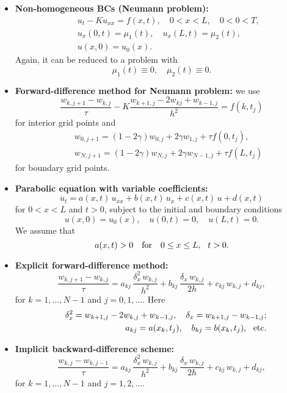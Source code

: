 \documentclass[12pt]{article}
\begin{document}
\begin{itemize}
\item \textbf{\textbf{Non-homogeneous BCs (Neumann problem):}}
\begin{eqnarray}
&&u_{t} - K u_{xx} = f(x,t), \quad
0<x< L, \quad 0<0<T,   \nonumber \\
&&u_{x}(0,t)=\mu_{1}(t), \quad u_{x}(L,t)=\mu_{2}(t), \nonumber \\
&&u(x, 0) = u_{0}(x).   \nonumber
\end{eqnarray}
Again, it can be reduced to a problem with
\[
\mu_{1}(t)\equiv 0, \quad \mu_{2}(t)\equiv 0.
\]


\item \textbf{Forward-difference method for Neumann problem:} we use
\[
\frac{w_{k,j+1}-w_{k,j}}{\tau}-K
\frac{w_{k+1, j}-2w_{kj}+w_{k-1,j}}{h^{2}}=f(k,t_j)
\]
for interior grid points and
\begin{eqnarray}
&&w_{0,j+1}=(1-2\gamma)w_{0,j}+2\gamma w_{1,j}+\tau f(0,t_j),  \nonumber \\
&&w_{N,j+1}=(1-2\gamma)w_{N,j}+2\gamma w_{N-1,j}+\tau f(L,t_j)  \nonumber
\end{eqnarray}
for boundary grid points.


\item \textbf{Parabolic equation with variable coefficients:}
\[
u_{t} =a(x,t) \, u_{xx} +
b(x,t) \, u_{x} + c(x,t) \, u + d(x,t)
\]
for $0<x< L$ and $t>0$, subject to the initial and boundary conditions
\[
u(x, 0) = u_{0}(x), \quad
u(0,t)=0, \quad u(L,t)=0.
\]
We assume that
\[
a(x,t)> 0 \quad {\rm for} \quad 0\leq x\leq L, \ \ t>0 .
\]


\item {\bf Explicit forward-difference method:}
\[
\frac{w_{k,j+1}-w_{k,j}}{\tau} =a_{kj} \, \frac{\delta_{x}^2  \, w_{k,j}}{h^{2}}+
b_{kj} \, \frac{\delta_{x} \,  w_{k,j}}{2h}+c_{kj} \, w_{k,j}+d_{kj},
\]
for $k=1, \dots,N-1$ and $j=0, 1,\dots$. Here
\begin{eqnarray}
&&\delta_{x}^2=w_{k+1,j}-2w_{k,j}+w_{k-1,j}, \quad \delta_{x}=w_{k+1,j}-w_{k-1,j}; \nonumber \\
&&a_{kj}=a(x_{k},t_{j}), \quad b_{kj}=b(x_{k},t_{j}), \ \ {\rm etc.} \nonumber
\end{eqnarray}


\item \textbf{Implicit backward-difference scheme:}
\[
\frac{w_{k,j}-w_{k,j-1}}{\tau} =a_{kj} \, \frac{\delta_{x}^2  \, w_{k,j}}{h^{2}}+
b_{kj} \, \frac{\delta_{x} \,  w_{k,j}}{2h}+c_{kj} \, w_{k,j}+d_{kj},
\]
for $k=1, \dots,N-1$ and $j=1, 2, \dots$.


\end{itemize}
\end{document}
